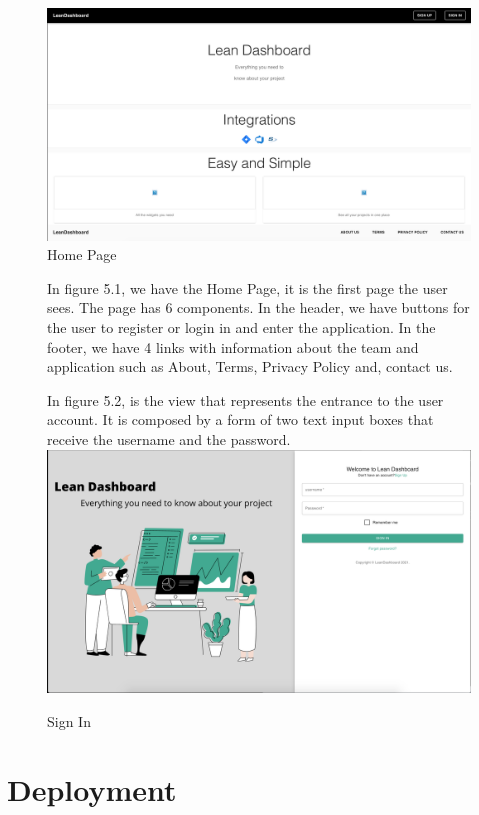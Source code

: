 \documentclass[a4paper,twoside,10pt]{report}
\begin{document}
\begin{figure}[h!]
\center
    \includegraphics[width=\textwidth]{HomePage.png}
\caption{Home Page}
\end{figure}
\begin{figure}[h!]

In figure 5.1, we have the Home Page, it is the first page the user sees. The page has 6 components. 
In the header, we have buttons for the user to register or login in and enter the application.
In the footer, we have 4 links with information about the team and application such as About, Terms, Privacy Policy and, contact us.

In figure 5.2, is the view that represents the entrance to the user account. It is composed by a form of two text input boxes that receive the username and the password.
\center
    \includegraphics[width=\textwidth]{SignIn.png}
\caption{Sign In}
\end{figure}

\chapter{Deployment}
\end{document}
